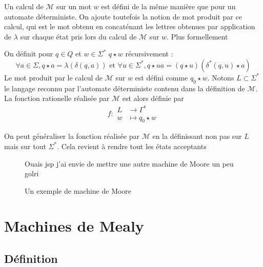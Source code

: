 \documentclass{scrartcl}
\begin{document}
\begin{flushleft}
Un calcul de $\mathcal{M}$ sur un mot $w$ est défini de la même manière que pour un automate déterministe. On ajoute
toutefois la notion de mot produit par ce calcul, qui est le mot obtenu en concaténant les lettres obtenues
par application de $\lambda$ sur chaque état pris lors du calcul de $\mathcal{M}$ sur $w$. Plus formellement

\begin{define}
    On définit pour $q \in Q$ et $w \in \Sigma^*$ $q \star w$ récursivement :
    \[ \forall a \in \Sigma, q \star a = \lambda(\delta(q, a)) \text{ et } \forall u \in \Sigma^*,
    q \star ua = (q \star u)(\delta^*(q, u) \star a) \]
    Le mot produit par le calcul de $\mathcal{M}$ sur $w$ est défini comme $q_0 \star w$. Notons $L \subset \Sigma^*$
    le langage reconnu par l'automate déterministe contenu dans la définition de $\mathcal{M}$. La fonction rationelle
    réalisée par $\mathcal{M}$ est alors définie par
    \[ f : \begin{array}{cl}
        L &\longrightarrow \Gamma^*\\
        w &\longmapsto q_0 \star w
    \end{array} \]
\end{define}

On peut généraliser la fonction réalisée par $\mathcal{M}$ en la définissant non pas sur $L$ mais sur tout
$\Sigma^*$. Cela revient à rendre tout les états acceptants

\begin{figure}[h]
    \caption{Un exemple de machine de Moore}
    \begin{center}
        Ouais jsp j'ai envie de mettre une autre machine de Moore un peu golri
        \begin{tikzpicture}[auto, node distance = 1.5cm]

        \end{tikzpicture}
    \end{center}
\end{figure}

\vspace*{2cm}

\section{Machines de Mealy}

\subsection{Définition}


\end{flushleft}
\end{document}
